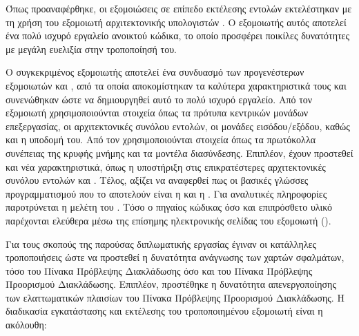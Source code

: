 Όπως προαναφέρθηκε, οι εξομοιώσεις σε επίπεδο εκτέλεσης εντολών εκτελέστηκαν με τη χρήση του εξομοιωτή αρχιτεκτονικής υπολογιστών \gem. Ο εξομοιωτής αυτός αποτελεί ένα πολύ ισχυρό εργαλείο ανοικτού κώδικα, το οποίο προσφέρει ποικίλες δυνατότητες με μεγάλη ευελιξία στην τροποποίησή του.
\par
Ο συγκεκριμένος εξομοιωτής αποτελεί ένα συνδυασμό των προγενέστερων εξομοιωτών  και , από τα οποία αποκομίστηκαν τα καλύτερα χαρακτηριστικά τους και συνενώθηκαν ώστε να δημιουργηθεί αυτό το πολύ ισχυρό εργαλείο. Από τον εξομοιωτή  χρησιμοποιούνται στοιχεία όπως τα πρότυπα κεντρικών μονάδων επεξεργασίας, οι αρχιτεκτονικές συνόλου εντολών, οι μονάδες εισόδου/εξόδου, καθώς και η υποδομή του. Από τον  χρησιμοποιούνται στοιχεία όπως τα πρωτόκολλα συνέπειας της κρυφής μνήμης και τα μοντέλα διασύνδεσης. Επιπλέον, έχουν προστεθεί και νέα χαρακτηριστικά, όπως η υποστήριξη στις επικρατέστερες αρχιτεκτονικές συνόλου εντολών  και . Τέλος, αξίζει να αναφερθεί πως οι βασικές γλώσσες προγραμματισμού που το αποτελούν είναι η  και η . Για αναλυτικές πληροφορίες παροτρύνεται η μελέτη του \cite{binkert2011gem5}. Τόσο ο πηγαίος κώδικας όσο και επιπρόσθετο υλικό παρέχονται ελεύθερα μέσω της επίσημης ηλεκτρονικής σελίδας του εξομοιωτή ().
\par
Για τους σκοπούς της παρούσας διπλωματικής εργασίας έγιναν οι κατάλληλες τροποποιήσεις ώστε να προστεθεί η δυνατότητα ανάγνωσης των χαρτών σφαλμάτων, τόσο του Πίνακα Πρόβλεψης Διακλάδωσης όσο και του Πίνακα Πρόβλεψης Προορισμού Διακλάδωσης. Επιπλέον, προστέθηκε η δυνατότητα απενεργοποίησης των ελαττωματικών πλαισίων του Πίνακα Πρόβλεψης Προορισμού Διακλάδωσης. Η διαδικασία εγκατάστασης και εκτέλεσης του τροποποιημένου εξομοιωτή είναι η ακόλουθη:

